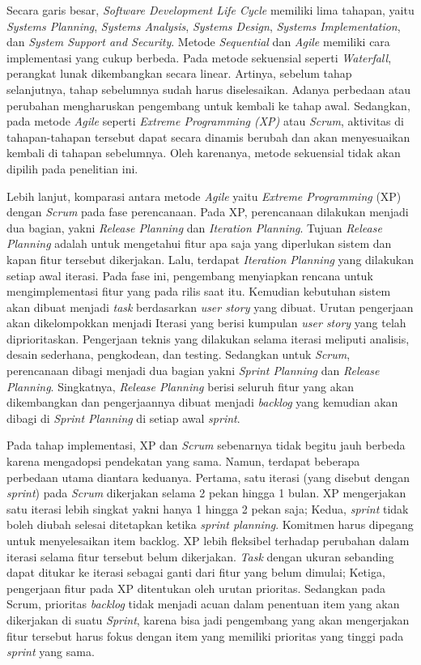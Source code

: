 Secara garis besar, \textit{Software Development Life Cycle} memiliki lima tahapan, yaitu \textit{Systems Planning}, \textit{Systems Analysis}, \textit{Systems Design}, \textit{Systems Implementation}, dan \textit{System Support and Security}. Metode \textit{Sequential} dan \textit{Agile} memiliki cara implementasi yang cukup berbeda. Pada metode sekuensial seperti \textit{Waterfall}, perangkat lunak dikembangkan secara linear. Artinya, sebelum tahap selanjutnya, tahap sebelumnya sudah harus diselesaikan. Adanya perbedaan atau perubahan mengharuskan pengembang untuk kembali ke tahap awal. Sedangkan, pada metode \textit{Agile} seperti \textit{Extreme Programming (XP)} atau \textit{Scrum}, aktivitas di tahapan-tahapan tersebut dapat secara dinamis berubah dan akan menyesuaikan kembali di tahapan sebelumnya. Oleh karenanya, metode sekuensial tidak akan dipilih pada penelitian ini.

Lebih lanjut, komparasi antara metode \textit{Agile} yaitu \textit{Extreme Programming} (XP) dengan \textit{Scrum} pada fase perencanaan. Pada XP, perencanaan dilakukan menjadi dua bagian, yakni \textit{Release Planning} dan \textit{Iteration Planning}. Tujuan \textit{Release Planning} adalah untuk mengetahui fitur apa saja yang diperlukan sistem dan kapan fitur tersebut dikerjakan. Lalu, terdapat \textit{Iteration Planning} yang dilakukan setiap awal iterasi. Pada fase ini, pengembang menyiapkan rencana untuk mengimplementasi fitur yang pada rilis saat itu. Kemudian kebutuhan sistem akan dibuat menjadi \textit{task} berdasarkan \textit{user story} yang dibuat. Urutan pengerjaan akan dikelompokkan menjadi Iterasi yang berisi kumpulan \textit{user story} yang telah diprioritaskan. Pengerjaan teknis yang dilakukan selama iterasi meliputi analisis, desain sederhana, pengkodean, dan testing. Sedangkan untuk \textit{Scrum}, perencanaan dibagi menjadi dua bagian yakni \textit{Sprint Planning} dan \textit{Release Planning}. Singkatnya, \textit{Release Planning} berisi seluruh fitur yang akan dikembangkan dan pengerjaannya dibuat menjadi \textit{backlog} yang kemudian akan dibagi di \textit{Sprint Planning} di setiap awal \textit{sprint}.

Pada tahap implementasi, XP dan \textit{Scrum} sebenarnya tidak begitu jauh berbeda karena mengadopsi pendekatan yang sama. Namun, terdapat beberapa perbedaan utama diantara keduanya. Pertama, satu iterasi (yang disebut dengan \textit{sprint}) pada \textit{Scrum} dikerjakan selama 2 pekan hingga 1 bulan. XP mengerjakan satu iterasi lebih singkat yakni hanya 1 hingga 2 pekan saja; Kedua, \textit{sprint} tidak boleh diubah selesai ditetapkan ketika \textit{sprint planning}. Komitmen harus dipegang untuk menyelesaikan item backlog. XP lebih fleksibel terhadap perubahan dalam iterasi selama fitur tersebut belum dikerjakan. \textit{Task} dengan ukuran sebanding dapat ditukar ke iterasi sebagai ganti dari fitur yang belum dimulai; Ketiga, pengerjaan fitur pada XP ditentukan oleh urutan prioritas. Sedangkan pada Scrum, prioritas \textit{backlog} tidak menjadi acuan dalam penentuan item yang akan dikerjakan di suatu \textit{Sprint}, karena bisa jadi pengembang yang akan mengerjakan fitur tersebut harus fokus dengan item yang memiliki prioritas yang tinggi pada \textit{sprint} yang sama. 

